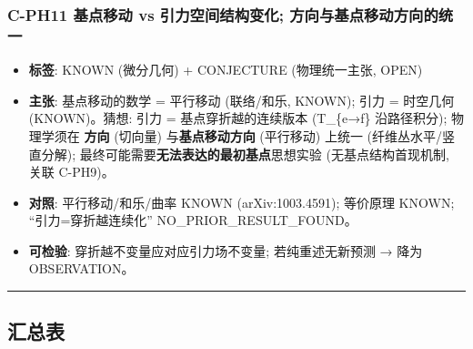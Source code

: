 \documentclass[
]{article}
\providecommand{\tightlist}{%
  \setlength{\itemsep}{0pt}\setlength{\parskip}{0pt}}
\begin{document}
\subsubsection{C-PH11 基点移动 vs 引力空间结构变化;
方向与基点移动方向的统一}\label{c-ph11-ux57faux70b9ux79fbux52a8-vs-ux5f15ux529bux7a7aux95f4ux7ed3ux6784ux53d8ux5316-ux65b9ux5411ux4e0eux57faux70b9ux79fbux52a8ux65b9ux5411ux7684ux7edfux4e00}

\begin{itemize}
\tightlist
\item
  \textbf{标签}: KNOWN (微分几何) + CONJECTURE (物理统一主张, OPEN)
\item
  \textbf{主张}: 基点移动的数学 = 平行移动 (联络/和乐, KNOWN); 引力 =
  时空几何 (KNOWN)。猜想: 引力 = 基点穿折越的连续版本 (T\_\{e→f\}
  沿路径积分); 物理学须在 \textbf{方向} (切向量) 与\textbf{基点移动方向}
  (平行移动) 上统一 (纤维丛水平/竖直分解);
  最终可能需要\textbf{无法表达的最初基点}思想实验 (无基点结构首现机制,
  关联 C-PH9)。
\item
  \textbf{对照}: 平行移动/和乐/曲率 KNOWN (arXiv:1003.4591); 等价原理
  KNOWN; ``引力=穿折越连续化'' NO\_PRIOR\_RESULT\_FOUND。
\item
  \textbf{可检验}: 穿折越不变量应对应引力场不变量; 若纯重述无新预测 →
  降为 OBSERVATION。
\end{itemize}

\begin{center}\rule{0.5\linewidth}{0.5pt}\end{center}

\subsection{汇总表}\label{ux6c47ux603bux8868}
\end{document}
